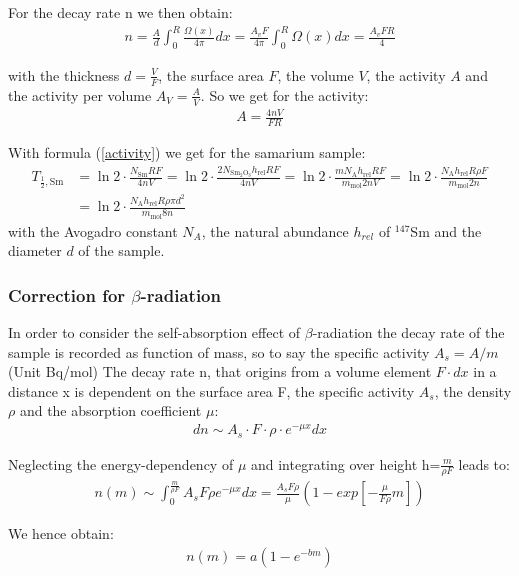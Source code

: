 \documentclass[12pt]{article}
\begin{document}
For the decay rate n we then obtain:
\begin{align}
n= \frac{A}{d}\int_{0}^{R}\frac{\Omega(x)}{4\pi}dx = \frac{A_v F}{4\pi}\int_{0}^{R}\Omega(x)dx = \frac{A_v F R}{4}
\end{align}

with the thickness $d=\frac{V}{F}$, the surface area $F$, the volume $V$, the activity $A$ and the activity per volume $A_V=\frac{A}{V}$. So we get for the activity:
\begin{align}
A=\frac{4nV}{FR}
\end{align}


With formula (\ref{activity}) we get for the samarium sample:
\begin{align}
	T_{\frac12,\text{Sm}}&=\ln2\cdot\frac{N_{\text{Sm}}RF}{4nV}=\ln2\cdot\frac{2N_{\text{Sm$_2$O$_3$}}h_{\text{rel}}RF}{4nV}=\ln2\cdot\frac{mN_{\text{A}}h_{\text{rel}}RF}{m_{\text{mol}}2nV}
	=\ln2\cdot\frac{N_{\text{A}}h_{\text{rel}}R\rho F}{m_{\text{mol}}2n}\\&
	 =\ln2\cdot\frac{N_{\text{A}}h_{\text{rel}}R\rho\pi d^2}{m_{\text{mol}}8n}\label{halflifeSm}
\end{align}
with the Avogadro constant $N_A$, the natural abundance $h_{rel}$ of $^{147}$Sm and the diameter $d$ of the sample.

\subsubsection{Correction for $\beta$-radiation}\label{betacorrection}

In order to consider the self-absorption effect of $\beta$-radiation the decay rate of the sample is recorded as function of mass, so to say the specific activity  $A_s=A/m$ (Unit Bq/mol)
The decay rate n, that origins from a volume element $F\cdot dx$ in a distance x is dependent on the surface area F, the specific activity $A_s$, the density $\rho$ and the absorption coefficient  $\mu$: 
\begin{align}
dn\sim A_s\cdot F\cdot \rho\cdot e^{-\mu x}dx
\end{align} 


Neglecting the energy-dependency of $\mu$ and integrating over height  h=$\frac{m}{\rho F}$ leads to:
\begin{align}
n(m)\sim\int_{0}^{\frac{m}{\rho F}}A_s F\rho e^{-\mu x}dx = \frac{A_s F\rho}{\mu}\left( 1-exp\left[ -\frac{\mu}{F\rho}m\right] \right)
\end{align}


We hence obtain:
\begin{align}
n(m)= a\left( 1-e^{-bm}\right)
\end{align}
\end{document}
